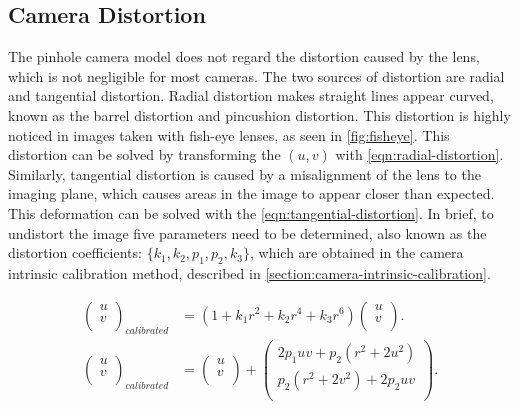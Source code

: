 \subsection{Camera Distortion}

The pinhole camera model does not regard the distortion caused by the lens, which is not negligible for most cameras. The two sources of distortion are radial and tangential distortion. Radial distortion makes straight lines appear curved, known as the barrel distortion and pincushion distortion. This distortion is highly noticed in images taken with fish-eye lenses, as seen in \cref{fig:fisheye}. This distortion can be solved by transforming the $(u, v)$ with \cref{eqn:radial-distortion}. Similarly, tangential distortion is caused by a misalignment of the lens to the imaging plane, which causes areas in the image to appear closer than expected. This deformation can be solved with the \cref{eqn:tangential-distortion}. In brief, to undistort the image five parameters need to be determined, also known as the distortion coefficients: $\{k_1, k_2, p_1, p_2, k_3\}$, which are obtained in the camera intrinsic calibration method, described in \cref{section:camera-intrinsic-calibration}.

\begin{align}
    \label{eqn:radial-distortion}
    \left(
        \begin{array}{c}
            u \\ v \\
        \end{array}
    \right)_{calibrated}
    & =
    (1 + k_1 r^2 + k_2 r^4 + k_3 r^6)
    \left(
        \begin{array}{c}
            u \\ v \\
        \end{array}
    \right).
    \\
    \label{eqn:tangential-distortion}
    \left(
        \begin{array}{c}
            u \\ v \\
        \end{array}
    \right)_{calibrated}
    & =
    \left(
        \begin{array}{c}
            u \\ v \\
        \end{array}
    \right)
    + 
    \left(
        \begin{array}{c}
            2 p_1 u v + p_2 (r^2 + 2u^2) \\
            p_2 (r^2 + 2v^2) + 2 p_2 u v \\
        \end{array}
    \right).
\end{align}

